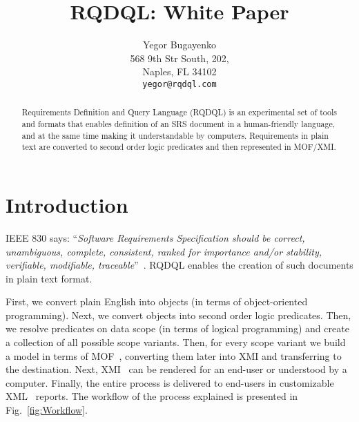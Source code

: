 \documentclass{article}
\begin{document}
\setlength{\parindent}{0pt}
\setlength{\parskip}{1em}
\newcommand{\type}[1]{\mbox{\texttt{#1}}}
\newenvironment{maths}
{
    \vspace*{0.5em}
    \begin{tabular}{l>{\raggedright\arraybackslash}p{20em}}
}
{
    \end{tabular}
    \vspace*{1em}
}




\title{RQDQL: White Paper}
    \author{
        Yegor Bugayenko\\
        568 9th Str South, 202, \\
        Naples, FL 34102\\
        \texttt{yegor@rqdql.com}
    }
    \maketitle
    \begin{abstract}
        Requirements Definition and Query Language (RQDQL) is
        an experimental set of tools and formats that enables definition of
        an SRS document in a
        human-friendly language, and at the same time making it understandable
        by computers. Requirements in plain text are converted to
        second order logic predicates and then represented in MOF/XMI.
    \end{abstract}




\section{Introduction}

    IEEE 830 says: ``\emph{Software Requirements Specification should be
    correct, unambiguous, complete, consistent, ranked for importance and/or stability,
    verifiable, modifiable, traceable}''~\cite{ieee830}. RQDQL enables the creation
    of such documents in plain text format.

    First, we convert plain English into objects (in terms of object-oriented
    programming). Next, we convert objects into second order logic predicates.
    Then, we resolve predicates on data scope (in terms of logical programming)
    and create a collection of all possible scope variants. Then, for every
    scope variant we build a model in terms of MOF~\cite{mof2}, converting them later
    into XMI and transferring to the destination. Next, XMI~\cite{mof-to-xmi} can be rendered
    for an end-user or understood by a computer. Finally, the entire process
    is delivered to end-users in customizable XML~\cite{xml} reports.
    The workflow of the process explained is presented in Fig.~\ref{fig:Workflow}.
\end{document}
